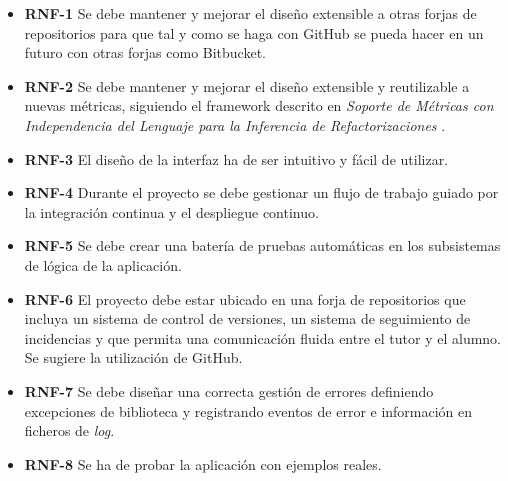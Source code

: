 \begin{itemize}
	\item \textbf{RNF-1} Se debe mantener y mejorar el diseño extensible a otras forjas de repositorios para que tal y como se haga con GitHub se pueda hacer en un futuro con otras forjas como Bitbucket.
	\item \textbf{RNF-2} Se debe mantener y mejorar el diseño extensible y reutilizable a nuevas métricas, siguiendo el framework descrito en \textit{Soporte de Métricas con Independencia del Lenguaje para la Inferencia de Refactorizaciones} \cite{marticorena_sanchez_soporte_2005}.
	\item \textbf{RNF-3} El diseño de la interfaz ha de ser intuitivo y fácil de utilizar.
	\item \textbf{RNF-4} Durante el proyecto se debe gestionar un flujo de trabajo guiado por la integración continua y el despliegue continuo.
	\item \textbf{RNF-5} Se debe crear una batería de pruebas automáticas en los subsistemas de lógica de la aplicación.
	\item \textbf{RNF-6} El proyecto debe estar ubicado en una forja de repositorios que incluya un sistema de control de versiones, un sistema de seguimiento de incidencias y que permita una comunicación fluida entre el tutor y el alumno. Se sugiere la utilización de GitHub.
	\item \textbf{RNF-7} Se debe diseñar una correcta gestión de errores definiendo excepciones de biblioteca y registrando eventos de error e información en ficheros de \textit{log}.
	\item \textbf{RNF-8} Se ha de probar la aplicación con ejemplos reales.
\end{itemize}
